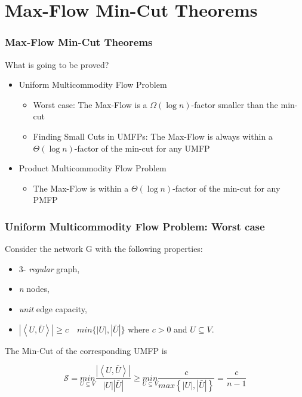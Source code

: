 
\setlength{\parskip}{\baselineskip} 
\section{Max-Flow Min-Cut Theorems}
\begin{frame}[t]
\frametitle{Max-Flow Min-Cut Theorems}
\begin{block}{What is going to be proved?}
	\begin{itemize}
		\item Uniform Multicommodity Flow Problem 
        \begin{itemize}
			\item Worst case: The Max-Flow is a $\Omega(\log n)$-factor smaller than the min-cut
            \item Finding Small Cuts in UMFPs: The Max-Flow is always within a $\Theta(\log n)$-factor of the min-cut for any UMFP
		\end{itemize}
	 	\item Product Multicommodity Flow Problem
        \begin{itemize}
			\item The Max-Flow is within a $\Theta(\log n)$-factor of the min-cut for any PMFP
		\end{itemize}
	 \end{itemize} 
\end{block}
\end{frame}

\begin{frame}
\frametitle{Uniform Multicommodity Flow Problem: Worst case}
Consider the network G with the following properties:
\begin{itemize}
	\item 3- \emph{regular} graph,
	\item \emph{n} nodes,
	\item \emph{unit} edge capacity,
    \item  $| \left \langle U, \bar{U} \right \rangle | \geq c \quad min \{| U | ,  | \bar{U}  | \}$ where $c>0$ and $U\subseteq V$.
\end{itemize}

The Min-Cut of the corresponding UMFP is 

$$\mathscr{S} = \underset{U\subseteq V}{min} \frac{\left | \left \langle U, \bar{U} \right \rangle \right |}{\left | U \right |\left | \bar{U} \right |} \geq \underset{U\subseteq V}{min} \frac{c}{max \left \{ \left | U \right |, \left | \bar{U} \right | \right \}} = \frac{c}{n-1}$$
\end{frame}

